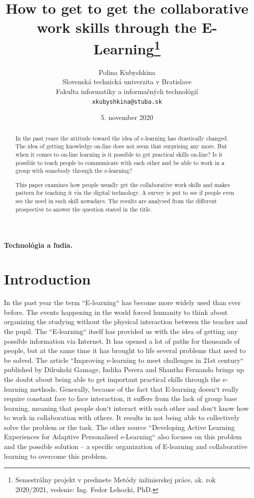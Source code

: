 \documentclass[10pt,oneside,english,a4paper]{article}
\title{How to get  to get the collaborative work skills through the E-Learning\thanks{Semestrálny projekt v predmete Metódy inžinierskej práce, ak. rok 2020/2021, vedenie: Ing. Fedor Lehocki, PhD.}}
\author{Polina Kubyshkina\\[2pt]
	{\small Slovenská technická univerzita v Bratislave}\\
	{\small Fakulta informatiky a informačných technológií}\\
	{\small \texttt{xkubyshkina@stuba.sk}}
	}
\date{\small  5. november 2020}
\begin{document}
\maketitle
\paragraph{Technológia a ľudia.}
\begin{abstract}
In the past years the attitude toward the idea of e-learning has drastically changed. The idea of getting knowledge on-line does not seem that surprising any more. But when it comes to on-line learning is it possible to get practical skills on-line? Is it possible to teach people to communicate with each other and be able to work in a group with somebody through the e-learning?\par
This paper examines how people usually get the collaborative work skills and makes pattern for teaching it via the digital technology. A survey is put to see if people even see the need in such skill nowadays. The results are analysed from the different prospective to answer the question stated in the title.
\end{abstract}

\section{Introduction}

In the past year the term ``E-learning`` has become more widely used than ever before. The events happening in the world forced humanity to think about organizing the studying without the physical interaction between the teacher and the pupil. The ``E-learning`` itself has provided us with the idea of getting any possible information via Internet. It has opened a lot of paths for thousands of people, but at the same time it has brought to life several problems that need to be solved. The article ``Improving e-learning to meet challenges in 21st century`` published by Dilrukshi Gamage, Indika Perera and Shantha Fernando brings up the doubt about being able to get important practical skills through the e-learning methods.\cite{collab2} Generally, because of the fact that E-learning doesn`t really require constant face to face interaction, it suffers from the lack of group base learning, meaning that people don`t interact with each other and don`t know how to work in collaboration with others. It results in not being able to collectively solve the problem or the task. The other source ``Developing Active Learning Experiences for Adaptive Personalised e-Learning`` also focuses on this problem and the possible solution – a specific organization of E-learning and collaborative learning to overcome this problem.\cite{collab1}
\end{document}
